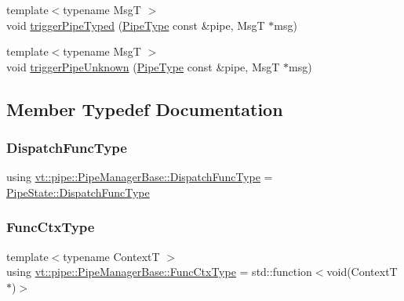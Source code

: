 \begin{DoxyCompactItemize}
\item 
{\footnotesize template$<$typename MsgT $>$ }\\void \hyperlink{structvt_1_1pipe_1_1_pipe_manager_base_a18038800a9665e59944db577325a3f76}{trigger\+Pipe\+Typed} (\hyperlink{namespacevt_ac9852acda74d1896f48f406cd72c7bd3}{Pipe\+Type} const \&pipe, MsgT $\ast$msg)
\item 
{\footnotesize template$<$typename MsgT $>$ }\\void \hyperlink{structvt_1_1pipe_1_1_pipe_manager_base_af796769ead9441e58e20ee9d43b2a313}{trigger\+Pipe\+Unknown} (\hyperlink{namespacevt_ac9852acda74d1896f48f406cd72c7bd3}{Pipe\+Type} const \&pipe, MsgT $\ast$msg)
\end{DoxyCompactItemize}


\subsection{Member Typedef Documentation}
\mbox{\label{structvt_1_1pipe_1_1_pipe_manager_base_a983e301505317c5ba2041461e7dec84a}} 
\subsubsection{\texorpdfstring{Dispatch\+Func\+Type}{DispatchFuncType}}
{\footnotesize\ttfamily using \hyperlink{structvt_1_1pipe_1_1_pipe_manager_base_a983e301505317c5ba2041461e7dec84a}{vt\+::pipe\+::\+Pipe\+Manager\+Base\+::\+Dispatch\+Func\+Type} =  \hyperlink{structvt_1_1pipe_1_1_pipe_state_ad81b637847d9c3185420c58c9272ed7d}{Pipe\+State\+::\+Dispatch\+Func\+Type}}

\mbox{\label{structvt_1_1pipe_1_1_pipe_manager_base_ad8463823b6b4cfdb67c119d6d22e3bac}} 
\subsubsection{\texorpdfstring{Func\+Ctx\+Type}{FuncCtxType}}
{\footnotesize\ttfamily template$<$typename ContextT $>$ \\
using \hyperlink{structvt_1_1pipe_1_1_pipe_manager_base_ad8463823b6b4cfdb67c119d6d22e3bac}{vt\+::pipe\+::\+Pipe\+Manager\+Base\+::\+Func\+Ctx\+Type} =  std\+::function$<$void(ContextT$\ast$)$>$}

